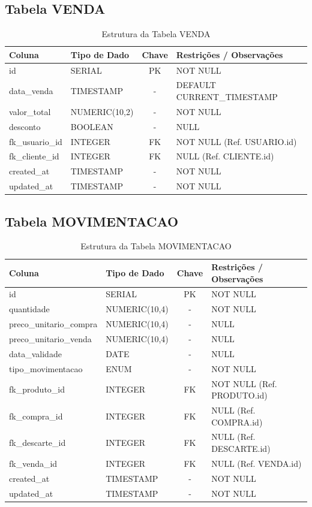 \documentclass[
	12pt,				%
	openany,			%
	oneside,			%
	a4paper,			%
	english,			%
	french,				%
	spanish,			%
	brazil				%
	]{abntex2}
\begin{document}
\begin{apendicesenv}
\subsection{Tabela VENDA}
\begin{table}[H]
\centering
\caption{Estrutura da Tabela VENDA}
\begin{tabular}{|l|p{4cm}|c|p{6cm}|}
\hline
\textbf{Coluna} & \textbf{Tipo de Dado} & \textbf{Chave} & \textbf{Restrições / Observações} \\ \hline
id & SERIAL & PK & NOT NULL \\ \hline
data\_venda & TIMESTAMP & - & DEFAULT CURRENT\_TIMESTAMP \\ \hline
valor\_total & NUMERIC(10,2) & - & NOT NULL \\ \hline
desconto & BOOLEAN & - & NULL \\ \hline
fk\_usuario\_id & INTEGER & FK & NOT NULL (Ref. USUARIO.id) \\ \hline
fk\_cliente\_id & INTEGER & FK & NULL (Ref. CLIENTE.id) \\ \hline
created\_at & TIMESTAMP & - & NOT NULL \\ \hline
updated\_at & TIMESTAMP & - & NOT NULL \\ \hline
\end{tabular}
\end{table}

\subsection{Tabela MOVIMENTACAO}
\begin{table}[H]
\centering
\caption{Estrutura da Tabela MOVIMENTACAO}
\begin{tabular}{|l|p{4cm}|c|p{6cm}|}
\hline
\textbf{Coluna} & \textbf{Tipo de Dado} & \textbf{Chave} & \textbf{Restrições / Observações} \\ \hline
id & SERIAL & PK & NOT NULL \\ \hline
quantidade & NUMERIC(10,4) & - & NOT NULL \\ \hline
preco\_unitario\_compra & NUMERIC(10,4) & - & NULL \\ \hline
preco\_unitario\_venda & NUMERIC(10,4) & - & NULL \\ \hline
data\_validade & DATE & - & NULL \\ \hline
tipo\_movimentacao & ENUM & - & NOT NULL \\ \hline
fk\_produto\_id & INTEGER & FK & NOT NULL (Ref. PRODUTO.id) \\ \hline
fk\_compra\_id & INTEGER & FK & NULL (Ref. COMPRA.id) \\ \hline
fk\_descarte\_id & INTEGER & FK & NULL (Ref. DESCARTE.id) \\ \hline
fk\_venda\_id & INTEGER & FK & NULL (Ref. VENDA.id) \\ \hline
created\_at & TIMESTAMP & - & NOT NULL \\ \hline
updated\_at & TIMESTAMP & - & NOT NULL \\ \hline
\end{tabular}
\end{table}


\end{apendicesenv}
\end{document}
